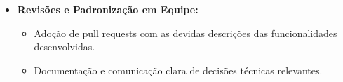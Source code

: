 \begin{itemize}
  \item \textbf{Revisões e Padronização em Equipe:}
  \begin{itemize}
    \item Adoção de pull requests com as devidas descrições das funcionalidades desenvolvidas.
    \item Documentação e comunicação clara de decisões técnicas relevantes.
  \end{itemize}
\end{itemize}
